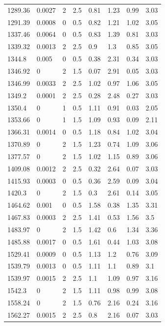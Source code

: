 \begin{longtable}[!h] {p{} p{} p{} p{} p{} p{} p{} p{}}
    1289.36 &	0.0027  &	2	&	2.5	 &	0.81 &	1.23 &	0.99 &	3.03\\
    1291.39 &	0.0008  &	0	&	0.5	 &	0.82 &	1.21 &	1.02 &	3.05\\
    1337.46 &	0.0064  &	0	&	0.5	 &	0.83 &	1.39 &	0.81 &	3.03\\
    1339.32 &	0.0013  &	2	&	2.5	 &	0.9  &	1.3  &	0.85 &	3.05\\
    1344.8  &	0.005   &	0	&	0.5	 &	0.38 &	2.31 &	0.34 &	3.03\\
    1346.92 &	0       &	2	&	1.5	 &	0.07 &	2.91 &	0.05 &	3.03\\
    1346.99 &	0.0033  &	2	&	2.5	 &	1.02 &	0.97 &	1.06 &	3.05\\
    1349.2  &	0.0001  &	2	&	2.5	 &	0.28 &	2.48 &	0.27 &	3.03\\
    1350.4  &	0       &	1	&	0.5	 &	1.11 &	0.91 &	0.03 &	2.05\\
    1353.66 &	0       &	1	&	1.5	 &	1.09 &	0.93 &	0.09 &	2.11\\
    1366.31 &	0.0014  &	0	&	0.5	 &	1.18 &	0.84 &	1.02 &	3.04\\
    1370.89 &	0       &	2	&	1.5	 &	1.23 & 	0.74 &	1.09 &	3.06\\
    1377.57 &	0       &	2	&	1.5	 &	1.02 &	1.15 &	0.89 &	3.06\\
    1409.08 &	0.0012  &	2	&	2.5	 &	0.32 &	2.64 &	0.07 &	3.03\\
    1415.93 &	0.0003  &	0	&	0.5	 &	0.36 &	2.59 &	0.09 &	3.04\\
    1420.3  &	0       &	2	&	1.5	 &	0.3  &	2.61 &	0.14 &	3.05\\
    1464.62 &	0.001   &	0	&	0.5	 &	1.58 &	0.38 &	1.35 &	3.31\\
    1467.83 &	0.0003  &	2	&	2.5	 &	1.41 &	0.53 &	1.56 &	3.5\\
    1483.97 &	0       &	2	&	1.5	 &	1.42 &	0.6  &	1.34 &	3.36\\
    1485.88 &	0.0017  &	0	&	0.5	 &	1.61 &	0.44 & 	1.03 &	3.08\\
    1529.41 &	0.0009  &	0	&	0.5	 &	1.13 &	1.2  &	0.76 &	3.09\\
    1539.79 &	0.0013  &	0	&	0.5	 &	1.11 &	1.1  &	0.89 &	3.1\\
    1539.97 &	0.0015  &	2	&	2.5	 &	1.1  &	1.09 &	0.97 &	3.16\\
    1542.3  &	0       &	2	&	1.5	 &	1.11 &	0.98 &	0.99 &	3.08\\
    1558.24 &	0       &	2	&	1.5	 &	0.76 &	2.16 &	0.24 &	3.16\\
    1562.27 &	0.0015  &	2	&	2.5	 &	0.8  &	2.16 &	0.07 &	3.03\\

\end{longtable}

